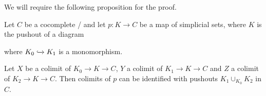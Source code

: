 We will require the following proposition for the proof.
\begin{prop}\label{prop:colimitDecompositionPushouts}
    Let $C$ be a cocomplete \inftycat/ and let $p\colon K\to C$ be a map of simplicial sets, where $K$ is the pushout of a diagram
    \begin{center}
    \end{center}
    where $K_0\xhookrightarrow{} K_1$ is a monomorphism.

    Let $X$ be a colimit of $K_0\to K\to C$, $Y$ a colimit of $K_1\to K\to C$ and $Z$ a colimit of $K_2\to K\to C$.
    Then colimits of $p$ can be identified with pushouts $K_1\cup_{K_0}K_2$ in $C$.
    \begin{reference}
        \cite[Proposition 4.4.2.2]{HTT}
    \end{reference}
\end{prop}

